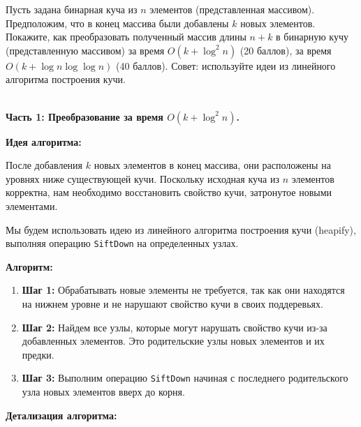 \documentclass[11pt]{article}
\begin{document}
\begin{problem}{40}
Пусть задана бинарная куча из $n$ элементов (представленная массивом). Предположим, что в конец массива были добавлены $k$ новых элементов.
Покажите, как преобразовать полученный массив длины $n + k$ в бинарную кучу (представленную массивом) за время $O(k + \log^2 n)$ (20 баллов), за время $O(k + \log n \log \log n)$ (40 баллов).
Совет: используйте идеи из линейного алгоритма построения кучи.
\end{problem}

\begin{solution}
    \\
    \textbf{Часть 1: Преобразование за время $O(k + \log^2 n)$.}

    \textbf{Идея алгоритма:}

    После добавления $k$ новых элементов в конец массива, они расположены на уровнях ниже существующей кучи. Поскольку исходная куча из $n$ элементов корректна, нам необходимо восстановить свойство кучи, затронутое новыми элементами.

    Мы будем использовать идею из линейного алгоритма построения кучи (heapify), выполняя операцию \texttt{SiftDown} на определенных узлах.

    \textbf{Алгоритм:}

    \begin{enumerate}
        \item \textbf{Шаг 1:} Обрабатывать новые элементы не требуется, так как они находятся на нижнем уровне и не нарушают свойство кучи в своих поддеревьях.
        \item \textbf{Шаг 2:} Найдем все узлы, которые могут нарушать свойство кучи из-за добавленных элементов. Это родительские узлы новых элементов и их предки.
        \item \textbf{Шаг 3:} Выполним операцию \texttt{SiftDown} начиная с последнего родительского узла новых элементов вверх до корня.
    \end{enumerate}

    \textbf{Детализация алгоритма:}


\end{solution}
\end{document}
